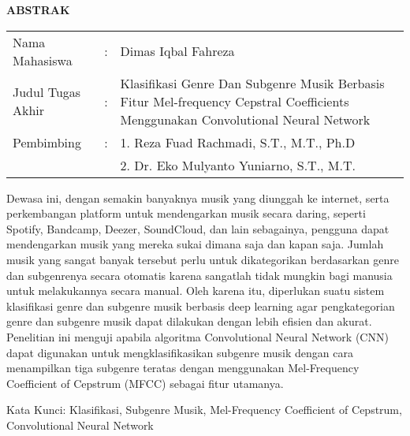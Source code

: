 \begin{center}
  \large\textbf{ABSTRAK}
\end{center}


\vspace{2ex}

\begingroup
  \setlength{\tabcolsep}{0pt}

  \noindent
  \begin{tabularx}{\textwidth}{l >{\centering}m{2em} X}
    Nama Mahasiswa    &:& Dimas Iqbal Fahreza \\

    Judul Tugas Akhir &:&	Klasifikasi Genre Dan Subgenre Musik Berbasis Fitur Mel-frequency Cepstral Coefficients Menggunakan Convolutional Neural Network \\

    Pembimbing        &:& 1. Reza Fuad Rachmadi, S.T., M.T., Ph.D \\
                      & & 2. Dr. Eko Mulyanto Yuniarno, S.T., M.T. \\
  \end{tabularx}
\endgroup

Dewasa ini, dengan semakin banyaknya musik yang diunggah ke internet, serta 
perkembangan platform untuk mendengarkan musik secara daring, seperti Spotify, 
Bandcamp, Deezer, SoundCloud, dan lain sebagainya, pengguna dapat mendengarkan musik 
yang mereka sukai dimana saja dan kapan saja. Jumlah musik yang sangat banyak tersebut 
perlu untuk dikategorikan berdasarkan genre dan subgenrenya secara otomatis karena sangatlah tidak 
mungkin bagi manusia untuk melakukannya secara manual. Oleh karena itu, diperlukan 
suatu sistem klasifikasi genre dan subgenre musik berbasis deep learning agar pengkategorian genre dan subgenre musik dapat dilakukan dengan lebih efisien dan akurat. Penelitian ini menguji apabila algoritma Convolutional Neural Network (CNN) dapat digunakan untuk mengklasifikasikan subgenre musik dengan cara menampilkan tiga subgenre teratas dengan menggunakan Mel-Frequency Coefficient of Cepstrum (MFCC) sebagai fitur utamanya.

Kata Kunci: Klasifikasi, Subgenre Musik, Mel-Frequency Coefficient of Cepstrum, Convolutional Neural Network
